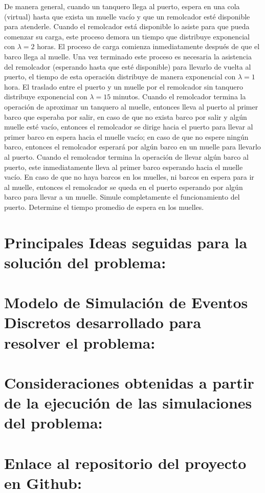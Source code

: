 \documentclass[titlepage,11pt]{scrartcl}
\begin{document}
	De manera general, cuando un tanquero llega al puerto, espera en una cola (virtual) hasta que exista un muelle vacío y que un remolcador esté disponible para atenderle. Cuando el remolcador está disponible lo asiste para que pueda comenzar su carga, este proceso demora un tiempo que distribuye exponencial con $\lambda = 2$ horas. El proceso de carga comienza inmediatamente después de que el barco llega al muelle. Una vez terminado este proceso es necesaria la asistencia del remolcador (esperando hasta que esté disponible) para llevarlo de vuelta al puerto, el tiempo de esta operación distribuye de manera exponencial con $\lambda = 1$ hora. El traslado entre el puerto y un muelle por el remolcador sin tanquero distribuye exponencial con $\lambda = 15$ minutos. Cuando el remolcador termina la operación de aproximar un tanquero al muelle, entonces lleva al puerto al primer barco que esperaba por salir, en caso de que no exista barco por salir y algún muelle esté vacío, entonces el remolcador se dirige hacia el puerto para llevar al primer barco en espera hacia el muelle vacío; en caso de que no espere ningún barco, entonces el remolcador esperará por algún barco en un muelle para llevarlo al puerto. Cuando el remolcador termina la operación de llevar algún barco al puerto, este inmediatamente lleva al primer barco esperando hacia el muelle vacío. En caso de que no haya barcos en los muelles, ni barcos en espera para ir al muelle, entonces el remolcador se queda en el puerto esperando por algún barco para llevar a un muelle. Simule completamente el funcionamiento del puerto. Determine el tiempo promedio de espera en los muelles.

\section{Principales Ideas seguidas para la solución del problema:}

\section{Modelo de Simulación de Eventos Discretos desarrollado para resolver el
problema:}

\section{Consideraciones obtenidas a partir de la ejecución de las simulaciones del
problema:}

\section{Enlace al repositorio del proyecto en Github:}
\end{document}
